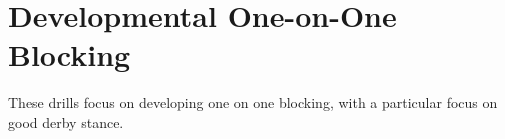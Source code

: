 \section*{Developmental One-on-One Blocking}

These drills focus on developing one on one blocking, with a particular focus on good derby stance. 
